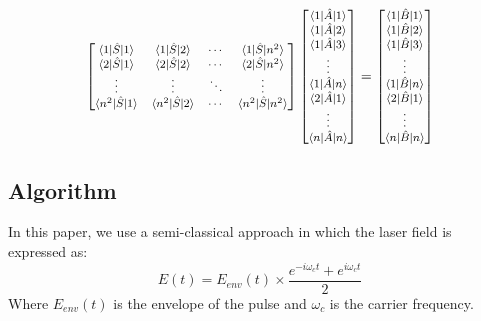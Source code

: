 \documentclass[11pt,a4paper]{article}
\begin{document}
\begin{equation}
\footnotesize
 \begin{bmatrix}
  \braket{ 1 | \hat{S}|1 } & \braket{ 1 | \hat{S}|2 } & \cdots & \braket{ 1 | \hat{S}|n^2 } \\
  \braket{ 2 | \hat{S}|1 } & \braket{ 2 | \hat{S}|2 } & \cdots & \braket{ 2 | \hat{S}|n^2 } \\
  \vdots  & \vdots  & \ddots & \vdots  \\
  \braket{ n^2 | \hat{S}|1 } & \braket{ n^2 | \hat{S}|2 } & \cdots & \braket{ n^2 | \hat{S}|n^2 }
 \end{bmatrix}
 \begin{bmatrix}
  \braket{ 1 | \hat{A}|1 }\\
  \braket{ 1 | \hat{A}|2 }\\
  \braket{ 1 | \hat{A}|3 }\\
  \vdots\\
  \braket{ 1 | \hat{A}|n }\\
  \braket{ 2 | \hat{A}|1 }\\
  \vdots\\
  \braket{ n | \hat{A}|n }\\
\end{bmatrix}
=
 \begin{bmatrix}
  \braket{ 1 | \hat{B}|1 }\\
  \braket{ 1 | \hat{B}|2 }\\
  \braket{ 1 | \hat{B}|3 }\\
  \vdots\\
  \braket{ 1 | \hat{B}|n }\\
  \braket{ 2 | \hat{B}|1 }\\
  \vdots\\
  \braket{ n | \hat{B}|n }\\
\end{bmatrix}
\end{equation}

\subsection{Algorithm}
In this paper, we use a semi-classical approach in which the laser field is expressed as:
\begin{equation}
  E(t) = E_{env}(t)\times  \frac{e^{-i\omega_c t}+e^{i\omega_c t}}{2}
\end{equation}
Where $E_{env}(t)$ is the envelope of the pulse and $\omega_c$ is the carrier frequency.\\
\end{document}

